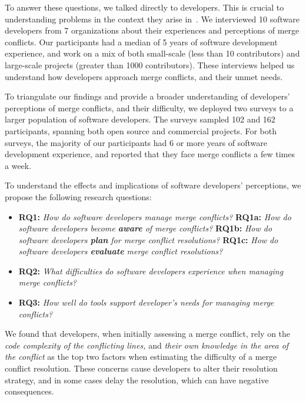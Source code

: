 To answer these questions, we talked directly to developers.
This is crucial to understanding problems in the context they arise in~\cite{fritz2010using, sillito2006questions, de2008answering, ko2007information}.
We interviewed 10 software developers from 7 organizations about their experiences and perceptions of merge conflicts. %
Our participants had a median of 5 years of software development experience, and work on a mix of both small-scale (less than 10 contributors) and large-scale projects (greater than 1000 contributors).
These interviews helped us understand how developers approach merge conflicts, and their unmet needs.

To triangulate our findings and provide a broader understanding of developers' perceptions of merge conflicts, and their difficulty, we deployed two surveys to a larger population of software developers.
The surveys sampled 102 and 162 participants, spanning both open source and commercial projects. 
For both surveys, the majority of our participants had 6 or more years of software development experience, and reported that they face merge conflicts a few times a week.

To understand the effects and implications of software developers' perceptions, we propose the following research questions:

\begin{itemize}
\item \textbf{RQ1:} \textit{How do software developers manage merge conflicts?}
\subitem \textbf{RQ1a:} \textit{How do software developers become \textbf{aware} of merge conflicts?}
\subitem \textbf{RQ1b:} \textit{How do software developers \textbf{plan} for merge conflict resolutions?}
\subitem \textbf{RQ1c:} \textit{How do software developers \textbf{evaluate} merge conflict resolutions?}
\item \textbf{RQ2:} \textit{What difficulties do software developers experience when managing merge conflicts?}
\item \textbf{RQ3:} \textit{How well do tools support developer's needs for managing merge conflicts?}
\end{itemize}

We found that developers, when initially assessing a merge conflict, rely on the \textit{code complexity of the conflicting lines,} and \textit{their own knowledge in the area of the conflict} as the top two factors when estimating the difficulty of a merge conflict resolution. 
These concerns cause developers to alter their resolution strategy, and in some cases delay the resolution, which can have negative consequences.

